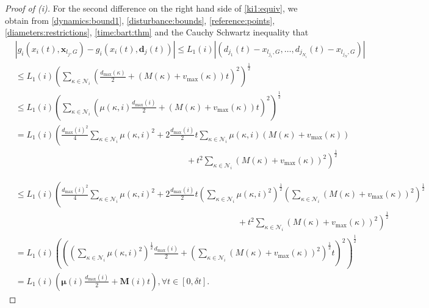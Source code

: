 \documentclass[reqno]{amsart}
\theoremstyle{plain}
\theoremstyle{definition}
\numberwithin{equation}{section}
\begin{document}
\begin{proof}[Proof of (i)]
\noindent For the second difference on the right hand side of \eqref{ki1:equiv}, we obtain from \eqref{dynamics:bound1},  \eqref{disturbance:bounds}, \eqref{reference:points}, \eqref{diameters:restrictions},  \eqref{time:bart:thm} and the Cauchy Schwartz inequality that
\begin{align*}
& |g_i(x_i(t),{\textbf{{x}}}_{l_j,G}) -  g_i(x_i(t),{\textbf{{d}}}_j(t))| \le L_{1}(i)|(d_{j_{1}}(t)-x_{l_{j_1},G},\ldots,d_{j_{N_i}}(t)-x_{l_{j_N},G})| \\
& \le  L_{1}(i)\left(\sum_{\kappa\in{\ensuremath{\mathcal{N}}}_i}\left(\frac{d_{\max}(\kappa)}{2}+(M(\kappa)+v_{\max}(\kappa))t\right)^{2}\right)^{\frac{1}{2}} \\
& \le  L_{1}(i)\left(\sum_{\kappa\in{\ensuremath{\mathcal{N}}}_i}\left(\mu(\kappa,i)\frac{d_{\max}(i)}{2}+(M(\kappa)+v_{\max}(\kappa))t\right)^{2}\right)^{\frac{1}{2}} \\ 
& = L_{1}(i)\left(\frac{d_{\max}(i)^2}{4}\sum_{\kappa\in{\ensuremath{\mathcal{N}}}_i}\mu(\kappa,i)^2+2\frac{d_{\max}(i)}{2}t\sum_{\kappa\in{\ensuremath{\mathcal{N}}}_i}\mu(\kappa,i)(M(\kappa)+v_{\max}(\kappa))\right. \\
& \left.\hspace{20em} +t^2\sum_{\kappa\in{\ensuremath{\mathcal{N}}}_i}(M(\kappa)+v_{\max}(\kappa))^2\right)^{\frac{1}{2}}
\end{align*}

\begin{align*}
 &\le L_{1}(i)\left(\frac{d_{\max}(i)^2}{4}\sum_{\kappa\in{\ensuremath{\mathcal{N}}}_i}\mu(\kappa,i)^2+2\frac{d_{\max}(i)}{2}t\left(\sum_{\kappa\in{\ensuremath{\mathcal{N}}}_i}\mu(\kappa,i)^2\right)^{\frac{1}{2}}
\left(\sum_{\kappa\in{\ensuremath{\mathcal{N}}}_i}(M(\kappa)+v_{\max}(\kappa))^2\right)^{\frac{1}{2}}\right. \\
&\left.\hspace{26em} +t^2\sum_{\kappa\in{\ensuremath{\mathcal{N}}}_i}(M(\kappa)+v_{\max}(\kappa))^2\right)^{\frac{1}{2}} \\
& = L_{1}(i)\left(\left(\left(\sum_{\kappa\in{\ensuremath{\mathcal{N}}}_i}\mu(\kappa,i)^2\right)^{\frac{1}{2}}\frac{d_{\max}(i)}{2}+
\left(\sum_{\kappa\in{\ensuremath{\mathcal{N}}}_i}(M(\kappa)+v_{\max}(\kappa))^2\right)^{\frac{1}{2}}t\right)^2\right)^{\frac{1}{2}} \\
& = L_{1}(i)\left({\ensuremath{\boldsymbol{{\mu}}}}(i)\frac{d_{\max}(i)}{2}+{\textbf{{M}}}(i)t\right),\forall t\in[0,\delta t].
\end{align*}


\end{proof}
\end{document}
